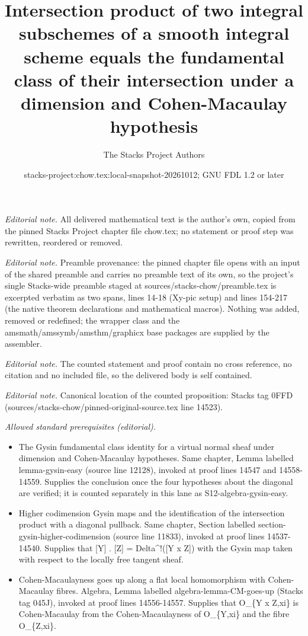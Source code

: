 \documentclass[10pt,a4paper]{amsart}
\title{Intersection product of two integral subschemes of a smooth integral scheme equals the fundamental class of their intersection under a dimension and Cohen-Macaulay hypothesis}
\author{The Stacks Project Authors}
\date{stacks-project:chow.tex:local-snapshot-20261012; GNU FDL 1.2 or later}
\theoremstyle{plain}
\theoremstyle{definition}
\theoremstyle{remark}
\numberwithin{equation}{subsection}
\begin{document}
\maketitle
\noindent\textit{Editorial note.} All delivered mathematical text is the author's own, copied from the pinned Stacks Project chapter file chow.tex; no statement or proof step was rewritten, reordered or removed.\par\medskip
\noindent\textit{Editorial note.} Preamble provenance: the pinned chapter file opens with an input of the shared preamble and carries no preamble text of its own, so the project's single Stacks-wide preamble staged at sources/stacks-chow/preamble.tex is excerpted verbatim as two spans, lines 14-18 (Xy-pic setup) and lines 154-217 (the native theorem declarations and mathematical macros). Nothing was added, removed or redefined; the wrapper class and the amsmath/amssymb/amsthm/graphicx base packages are supplied by the assembler.\par\medskip
\noindent\textit{Editorial note.} The counted statement and proof contain no cross reference, no citation and no included file, so the delivered body is self contained.\par\medskip
\noindent\textit{Editorial note.} Canonical location of the counted proposition: Stacks tag 0FFD (sources/stacks-chow/pinned-original-source.tex line 14523).\par\medskip
\noindent\textit{Allowed standard prerequisites (editorial).}\begin{itemize}
\item The Gysin fundamental class identity for a virtual normal sheaf under dimension and Cohen-Macaulay hypotheses. Same chapter, Lemma labelled lemma-gysin-easy (source line 12128), invoked at proof lines 14547 and 14558-14559. Supplies the conclusion once the four hypotheses about the diagonal are verified; it is counted separately in this lane as S12-algebra-gysin-easy.
\item Higher codimension Gysin maps and the identification of the intersection product with a diagonal pullback. Same chapter, Section labelled section-gysin-higher-codimension (source line 11833), invoked at proof lines 14537-14540. Supplies that [Y] . [Z] = Delta\textasciicircum{}!([Y x Z]) with the Gysin map taken with respect to the locally free tangent sheaf.
\item Cohen-Macaulayness goes up along a flat local homomorphism with Cohen-Macaulay fibres. Algebra, Lemma labelled algebra-lemma-CM-goes-up (Stacks tag 045J), invoked at proof lines 14556-14557. Supplies that O\_\{Y x Z,xi\} is Cohen-Macaulay from the Cohen-Macaulayness of O\_\{Y,xi\} and the fibre O\_\{Z,xi\}.
\end{itemize}\medskip
\end{document}
